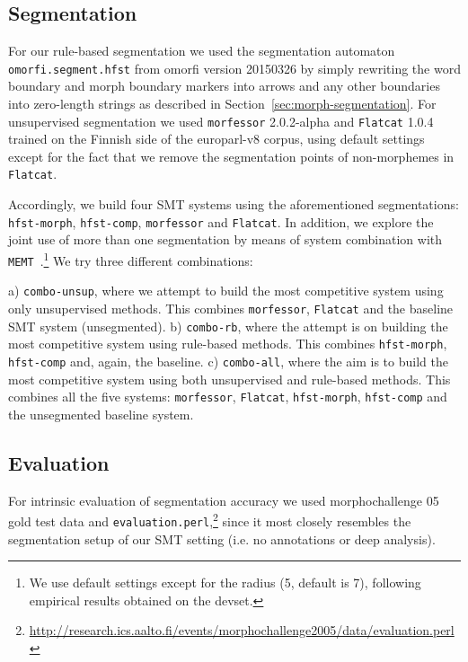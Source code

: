 \documentclass[free]{flammie}
\begin{document}
\subsection{Segmentation}

For our rule-based segmentation we used the segmentation automaton \texttt{omorfi.seg\-ment.hfst} from omorfi version 20150326 by simply rewriting the word boundary and morph boundary markers into arrows and any other boundaries into zero-length strings as described in Section~\ref{sec:morph-segmentation}.
For unsupervised segmentation we used \texttt{morfessor} 2.0.2-alpha and \texttt{Flatcat} 1.0.4 trained on the Finnish side of the europarl-v8 corpus, using default settings except for the fact that we remove the segmentation points of non-morphemes in \texttt{Flatcat}.

Accordingly, we build four SMT systems using the aforementioned segmentations: \texttt{hfst-morph}, \texttt{hfst-comp}, \texttt{morfessor} and \texttt{Flatcat}.
In addition, we explore the joint use of more than one segmentation by means of system combination with \texttt{MEMT}~\cite{heafield2010combining}.\footnote{We use default settings except for the %
radius (5, default is 7), following empirical results obtained on the devset.}
We try three different combinations:

a) \texttt{combo-unsup}, where we attempt to build the most competitive system using only unsupervised methods. This combines \texttt{morfessor}, \texttt{Flatcat} and the baseline SMT system (unsegmented).
b) \texttt{combo-rb}, where the attempt is on building the most competitive system using rule-based methods. This combines \texttt{hfst-morph}, \texttt{hfst-comp} and, again, the baseline.
c) \texttt{combo-all}, where the aim is to build the most competitive system using both unsupervised and rule-based methods. This combines all the five systems: \texttt{morfessor}, \texttt{Flatcat}, \texttt{hfst-morph}, \texttt{hfst-comp} and the unsegmented baseline system.

\subsection{Evaluation}
For intrinsic evaluation of segmentation accuracy we used morphochallenge 05~\cite{kurimo2006unsupervised} gold test data and \texttt{evaluation.perl},\footnote{\url{http://research.ics.aalto.fi/events/morphochallenge2005/data/evaluation.perl}} since it most closely resembles the segmentation setup of our SMT setting (i.e. no annotations or deep analysis).
\end{document}
